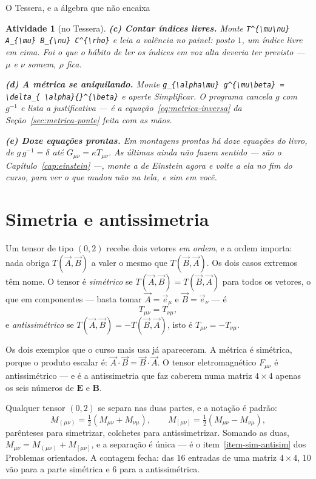 \documentclass[12pt,a4paper,oneside]{book}
\theoremstyle{rgplain}
\newtheorem{activity}{Atividade}[chapter]
\theoremstyle{rgremark}
\begin{document}
\begin{interludio}{O Tessera, e a álgebra que não encaixa}
\begin{activity}[no Tessera]
\textbf{(c) Contar índices livres.} Monte
\texttt{T\^{}\{\textbackslash mu\textbackslash nu\} A\_\{\textbackslash mu\}
B\_\{\textbackslash nu\} C\^{}\{\textbackslash rho\}} e leia a valência no
painel: posto $1$, um índice livre em cima. Foi o que o hábito de ler os
índices em voz alta deveria ter previsto --- $\mu$ e $\nu$ somem, $\rho$ fica.

\textbf{(d) A métrica se aniquilando.} Monte
\texttt{g\_\{\textbackslash alpha\textbackslash mu\}
g\^{}\{\textbackslash mu\textbackslash beta\} = \textbackslash delta\_\{%
\textbackslash alpha\}\{\}\^{}\{\textbackslash beta\}} e aperte
\textsf{Simplificar}. O programa cancela $g$ com $g^{-1}$ e lista a
justificativa --- é a equação~\eqref{eq:metrica-inversa} da
Seção~\ref{sec:metrica-ponte} feita com as mãos.

\textbf{(e) Doze equações prontas.} Em \textsf{montagens prontas} há doze
equações do livro, de $g\,g^{-1}=\delta$ até $G_{\mu\nu}=\kappa T_{\mu\nu}$.
As últimas ainda não fazem sentido --- são o Capítulo~\ref{cap:einstein} ---,
monte a de Einstein agora e volte a ela no fim do curso, para ver o que mudou
não na tela, e sim em você.
\end{activity}

\end{interludio}

\clearpage

\section{Simetria e antissimetria}
\label{sec:simetrias}

Um tensor de tipo $(0,2)$ recebe dois vetores \emph{em ordem}, e a ordem
importa: nada obriga $T(\vec A,\vec B)$ a valer o mesmo que $T(\vec B,\vec A)$.
Os dois casos extremos têm nome. O tensor é \emph{simétrico} se
$T(\vec A,\vec B)=T(\vec B,\vec A)$ para todos os vetores, o que em componentes
--- basta tomar $\vec A=\vec e_\mu$ e $\vec B=\vec e_\nu$ --- é
\[
  T_{\mu\nu}=T_{\nu\mu},
\]
e \emph{antissimétrico} se $T(\vec A,\vec B)=-T(\vec B,\vec A)$, isto é
$T_{\mu\nu}=-T_{\nu\mu}$.

Os dois exemplos que o curso mais usa já apareceram. A métrica é simétrica,
porque o produto escalar é: $\vec A\cdot\vec B=\vec B\cdot\vec A$. O tensor
eletromagnético $F_{\mu\nu}$ é antissimétrico --- e é a antissimetria que faz
caberem numa matriz $4\times4$ apenas os seis números de $\bm E$ e $\bm B$.

Qualquer tensor $(0,2)$ se separa nas duas partes, e a notação é padrão:
\begin{equation}
  M_{(\mu\nu)}=\tfrac12\!\left(M_{\mu\nu}+M_{\nu\mu}\right),\qquad
  M_{[\mu\nu]}=\tfrac12\!\left(M_{\mu\nu}-M_{\nu\mu}\right),
  \label{eq:sim-antisim}
\end{equation}
parênteses para simetrizar, colchetes para antissimetrizar. Somando as duas,
$M_{\mu\nu}=M_{(\mu\nu)}+M_{[\mu\nu]}$, e a separação é única --- é o
item~\ref{item-sim-antisim} dos Problemas orientados. A contagem fecha: das
$16$ entradas de uma matriz $4\times4$, $10$ vão para a parte simétrica e $6$
para a antissimétrica.
\end{document}
